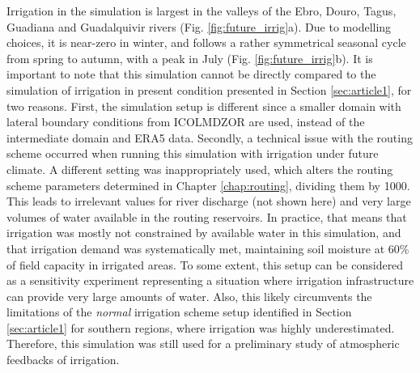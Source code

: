 Irrigation in the \futirr simulation is largest in the valleys of the Ebro, Douro, Tagus, Guadiana and Guadalquivir rivers (Fig. \ref{fig:future_irrig}a). Due to modelling choices, it is near-zero in winter, and follows a rather symmetrical seasonal cycle from spring to autumn, with a peak in July (Fig. \ref{fig:future_irrig}b).
It is important to note that this simulation cannot be directly compared to the simulation of irrigation in present condition presented in Section \ref{sec:article1}, for two reasons. First, the simulation setup is different since a smaller domain with lateral boundary conditions from ICOLMDZOR are used, instead of the intermediate domain and ERA5 data. Secondly, a technical issue with the routing scheme occurred when running this simulation with irrigation under future climate. A different setting was inappropriately used, which alters the routing scheme parameters determined in Chapter \ref{chap:routing}, dividing them by 1000. This leads to irrelevant values for river discharge (not shown here) and very large volumes of water available in the routing reservoirs. In practice, that means that irrigation was mostly not constrained by available water in this simulation, and that irrigation demand was systematically met, maintaining soil moisture at 60\% of field capacity in irrigated areas.
To some extent, this setup can be considered as a sensitivity experiment representing a situation where irrigation infrastructure can provide very large amounts of water. Also, this likely circumvents the limitations of the \textit{normal} irrigation scheme setup identified in Section \ref{sec:article1} for southern regions, where irrigation was highly underestimated. Therefore, this simulation was still used for a preliminary study of atmospheric feedbacks of irrigation.

